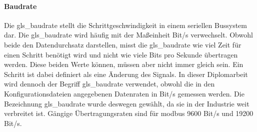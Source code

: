 \paragraph{Baudrate} \label{baud_rate}
Die \gls{gls_baudrate} stellt die Schrittgeschwindigkeit in einem seriellen Bussystem dar. Die \gls{gls_baudrate} wird häufig mit der Maßeinheit Bit/s verwechselt. Obwohl beide den Datendurchsatz darstellen, misst die \gls{gls_baudrate} wie viel Zeit für einen Schritt benötigt wird und nicht wie viele Bits pro Sekunde übertragen werden. Diese beiden Werte können, müssen aber nicht immer gleich sein. Ein Schritt ist dabei definiert als eine Änderung des Signals. 
\cite{KUNBUS_GmbH_Baudrate:o.J.}
In dieser Diplomarbeit wird dennoch der Begriff \gls{gls_baudrate} verwendet, obwohl die in den Konfigurationsdateien angegebenen Datenraten in Bit/s gemessen werden. Die Bezeichnung \gls{gls_baudrate} wurde deswegen gewählt, da sie in der Industrie weit verbreitet ist. Gängige Übertragungsraten sind für \gls{modbus} 9600 Bit/s und 19200 Bit/s.
